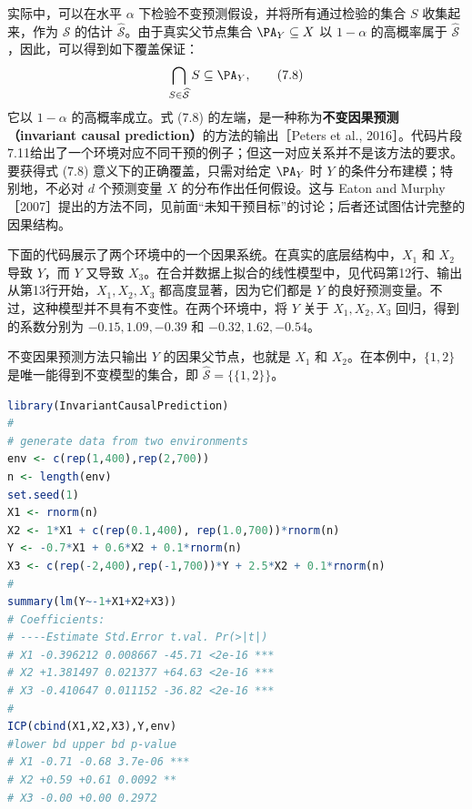 实际中，可以在水平 $\alpha$ 下检验不变预测假设，并将所有通过检验的集合 $S$ 收集起来，作为 $\mathcal S$ 的估计 $\widehat{\mathcal S}$。由于真实父节点集合 $\PA_Y\subseteq X$ 以 $1-\alpha$ 的高概率属于 $\widehat{\mathcal S}$，因此，可以得到如下覆盖保证：
\begin{equation}
 \bigcap_{S\in\widehat{\mathcal S}}S\subseteq\PA_Y,
 \tag{7.8}
\end{equation}
它以 $1-\alpha$ 的高概率成立。式 (7.8) 的左端，是一种称为\textbf{不变因果预测（invariant causal prediction）}的方法的输出［Peters et al., 2016］。代码片段7.11给出了一个环境对应不同干预的例子；但这一对应关系并不是该方法的要求。要获得式 (7.8) 意义下的正确覆盖，只需对给定 $\PA_Y$ 时 $Y$ 的条件分布建模；特别地，不必对 $d$ 个预测变量 $X$ 的分布作出任何假设。这与 Eaton and Murphy［2007］提出的方法不同，见前面“未知干预目标”的讨论；后者还试图估计完整的因果结构。

\Needspace{14cm}
\begin{codesnippet}
下面的代码展示了两个环境中的一个因果系统。在真实的底层结构中，$X_1$ 和 $X_2$ 导致 $Y$，而 $Y$ 又导致 $X_3$。在合并数据上拟合的线性模型中，见代码第12行、输出从第13行开始，$X_1,X_2,X_3$ 都高度显著，因为它们都是 $Y$ 的良好预测变量。不过，这种模型并不具有不变性。在两个环境中，将 $Y$ 关于 $X_1,X_2,X_3$ 回归，得到的系数分别为 $-0.15,1.09,-0.39$ 和 $-0.32,1.62,-0.54$。

不变因果预测方法只输出 $Y$ 的因果父节点，也就是 $X_1$ 和 $X_2$。在本例中，$\{1,2\}$ 是唯一能得到不变模型的集合，即 $\widehat{\mathcal S}=\{\{1,2\}\}$。
\begin{lstlisting}[language=R]
library(InvariantCausalPrediction)
#
# generate data from two environments
env <- c(rep(1,400),rep(2,700))
n <- length(env)
set.seed(1)
X1 <- rnorm(n)
X2 <- 1*X1 + c(rep(0.1,400), rep(1.0,700))*rnorm(n)
Y <- -0.7*X1 + 0.6*X2 + 0.1*rnorm(n)
X3 <- c(rep(-2,400),rep(-1,700))*Y + 2.5*X2 + 0.1*rnorm(n)
#
summary(lm(Y~-1+X1+X2+X3))
# Coefficients:
# ----Estimate Std.Error t.val. Pr(>|t|)
# X1 -0.396212 0.008667 -45.71 <2e-16 ***
# X2 +1.381497 0.021377 +64.63 <2e-16 ***
# X3 -0.410647 0.011152 -36.82 <2e-16 ***
#
ICP(cbind(X1,X2,X3),Y,env)
#lower bd upper bd p-value
# X1 -0.71 -0.68 3.7e-06 ***
# X2 +0.59 +0.61 0.0092 **
# X3 -0.00 +0.00 0.2972
\end{lstlisting}
\end{codesnippet}
